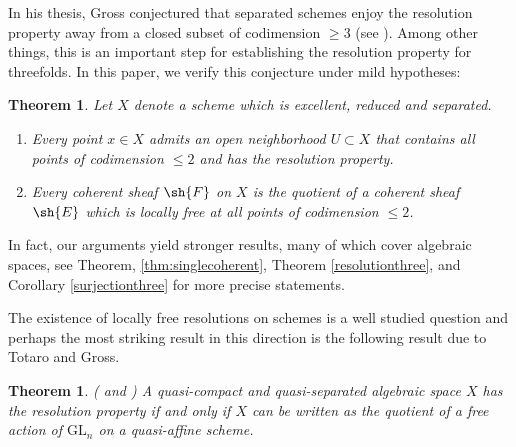 \documentclass[12pt]{amsart}
\newtheorem*{theorem*}{Theorem}
\newtheorem{maintheorem}{Theorem}
\begin{document}
In his thesis, Gross conjectured that separated schemes enjoy the resolution property away from a closed subset of codimension $\geq 3$ (see \cite[Conj. 2.0.3]{Grossthesis}). Among other things, this is an important step for establishing the resolution property for threefolds. In this paper, we verify this conjecture under mild hypotheses:
\begin{maintheorem} \label{maintheorem} Let $X$ denote a scheme which is excellent, reduced and separated. 
\begin{enumerate} \item Every point $x \in X$ admits an open neighborhood $U \subset X$ that contains all points of codimension $\leq 2$ and has the resolution property. 
\item Every coherent sheaf $\sh{F}$ on $X$ is the quotient of a coherent sheaf $\sh{E}$ which is locally free at all points of codimension $\leq 2$. \end{enumerate} \end{maintheorem}

\noindent In fact, our arguments yield stronger results, many of which cover algebraic spaces, see Theorem, \ref{thm:singlecoherent}, Theorem \ref{resolutionthree}, and Corollary \ref{surjectionthree} for more precise statements. 

The existence of locally free resolutions on schemes is a well studied question and perhaps the most striking result in this direction is the following result due to Totaro and Gross.

\begin{theorem*} (\cite[Thm. 1.1]{TotaroRes} and \cite[Thm. 1.1]{GrossRes}) A quasi-compact and quasi-separated  algebraic space $X$ has the resolution property if and only if $X$ can be written as the quotient of a free action of $\mathrm{GL}_n$ on a quasi-affine scheme. \end{theorem*}
\end{document}
